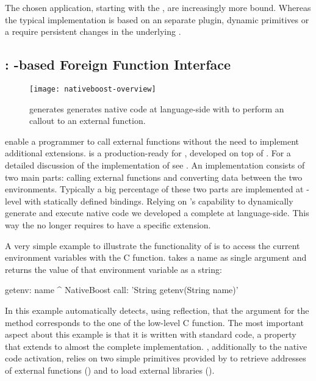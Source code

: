 The chosen application, starting with the \FFI, are increasingly more \VM bound.
Whereas the typical \FFI implementation is based on an separate plugin, dynamic primitives or a \JIT require persistent changes in the underlying \VM.


\subsection{\NB: \B-based Foreign Function Interface}

\begin{figure}[h]
	\centering
	\texttt{[image: nativeboost-overview]}
	\caption[\NB Overview]{\NB generates generates native code at language-side with \B to perform an \FFI callout to an external function.}
\end{figure}

\noindent \FFIs enable a programmer to call external functions without the need to implement additional \VM extensions.
\NB \cite{Brun13a} is a production-ready \FFI for \PH, developed on top of \B. 
For a detailed discussion of the implementation of \NB see .
An \FFI implementation consists of two main parts: calling external functions and converting data between the two environments.
Typically a big percentage of these two parts are implemented at \VM-level with statically defined bindings.
Relying on \B's capability to dynamically generate and execute native code we developed a complete \FFI at language-side.
This way the \VM no longer requires to have a specific \FFI extension.

A very simple example to illustrate the functionality of \NB is to access the current environment variables with the  C function.
 takes a name as single argument and returns the value of that environment variable as a string:
%
\begin{stcode}{4}
getenv: name
    ^ NativeBoost call: 'String getenv(String name)'
\end{stcode}
%
In this example \NB automatically detects, using reflection, that the argument for the \PH method corresponds to the one of the low-level C function.
The most important aspect about this example is that it is written with standard \PH code, a property that extends to almost the complete implementation.
\NB, additionally to the native code activation, relies on two simple primitives provided by \B to retrieve addresses of external functions () and to load external libraries ().

